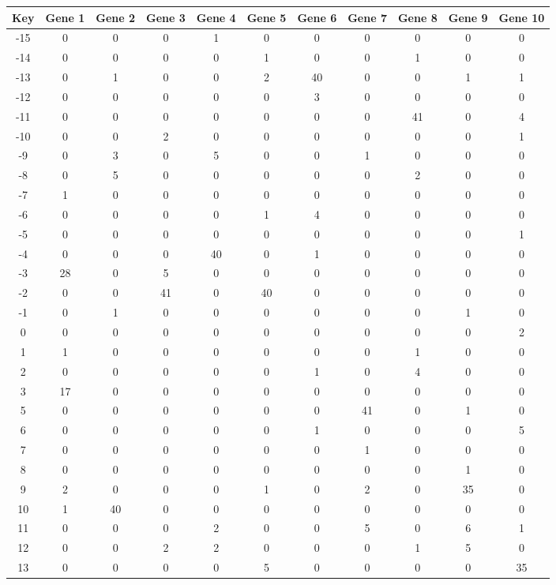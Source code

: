 \begin{tabular}{|c|c|c|c|c|c|c|c|c|c|c|}
\hline
Key & Gene 1 & Gene 2 & Gene 3 & Gene 4 & Gene 5 & Gene 6 & Gene 7 & Gene 8 & Gene 9 & Gene 10 \\
\hline
-15 & 0 & 0 & 0 & 1 & 0 & 0 & 0 & 0 & 0 & 0 \\
-14 & 0 & 0 & 0 & 0 & 1 & 0 & 0 & 1 & 0 & 0 \\
-13 & 0 & 1 & 0 & 0 & 2 & 40 & 0 & 0 & 1 & 1 \\
-12 & 0 & 0 & 0 & 0 & 0 & 3 & 0 & 0 & 0 & 0 \\
-11 & 0 & 0 & 0 & 0 & 0 & 0 & 0 & 41 & 0 & 4 \\
-10 & 0 & 0 & 2 & 0 & 0 & 0 & 0 & 0 & 0 & 1 \\
-9 & 0 & 3 & 0 & 5 & 0 & 0 & 1 & 0 & 0 & 0 \\
-8 & 0 & 5 & 0 & 0 & 0 & 0 & 0 & 2 & 0 & 0 \\
-7 & 1 & 0 & 0 & 0 & 0 & 0 & 0 & 0 & 0 & 0 \\
-6 & 0 & 0 & 0 & 0 & 1 & 4 & 0 & 0 & 0 & 0 \\
-5 & 0 & 0 & 0 & 0 & 0 & 0 & 0 & 0 & 0 & 1 \\
-4 & 0 & 0 & 0 & 40 & 0 & 1 & 0 & 0 & 0 & 0 \\
-3 & 28 & 0 & 5 & 0 & 0 & 0 & 0 & 0 & 0 & 0 \\
-2 & 0 & 0 & 41 & 0 & 40 & 0 & 0 & 0 & 0 & 0 \\
-1 & 0 & 1 & 0 & 0 & 0 & 0 & 0 & 0 & 1 & 0 \\
0 & 0 & 0 & 0 & 0 & 0 & 0 & 0 & 0 & 0 & 2 \\
1 & 1 & 0 & 0 & 0 & 0 & 0 & 0 & 1 & 0 & 0 \\
2 & 0 & 0 & 0 & 0 & 0 & 1 & 0 & 4 & 0 & 0 \\
3 & 17 & 0 & 0 & 0 & 0 & 0 & 0 & 0 & 0 & 0 \\
5 & 0 & 0 & 0 & 0 & 0 & 0 & 41 & 0 & 1 & 0 \\
6 & 0 & 0 & 0 & 0 & 0 & 1 & 0 & 0 & 0 & 5 \\
7 & 0 & 0 & 0 & 0 & 0 & 0 & 1 & 0 & 0 & 0 \\
8 & 0 & 0 & 0 & 0 & 0 & 0 & 0 & 0 & 1 & 0 \\
9 & 2 & 0 & 0 & 0 & 1 & 0 & 2 & 0 & 35 & 0 \\
10 & 1 & 40 & 0 & 0 & 0 & 0 & 0 & 0 & 0 & 0 \\
11 & 0 & 0 & 0 & 2 & 0 & 0 & 5 & 0 & 6 & 1 \\
12 & 0 & 0 & 2 & 2 & 0 & 0 & 0 & 1 & 5 & 0 \\
13 & 0 & 0 & 0 & 0 & 5 & 0 & 0 & 0 & 0 & 35 \\
\hline
\end{tabular}